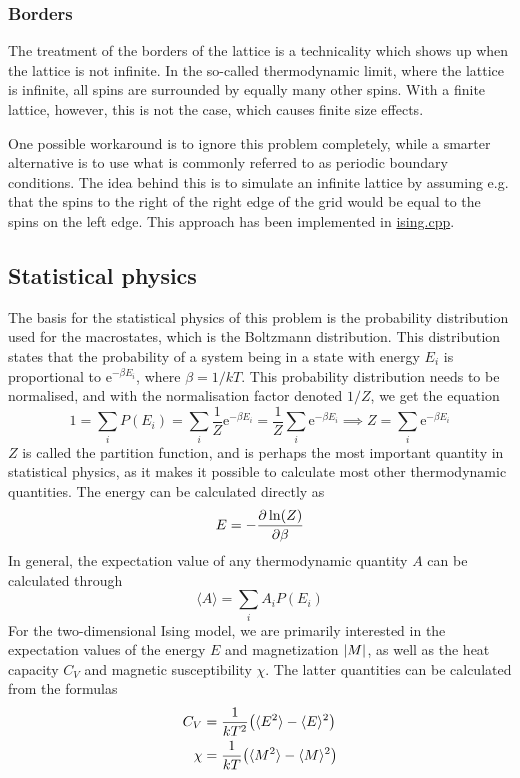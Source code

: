 \documentclass[12pt,english,a4paper]{article}
\renewcommand{\exp}[1]{\mathrm{e}^{#1}}
\newcommand{\program}[1]{\href{https://github.com/anjohan/Offentlig/blob/master/FYS3150/Oblig4/#1}{#1}}
\begin{document}
\subsubsection{Borders}
The treatment of the borders of the lattice is a technicality which shows up when the lattice is not infinite. In the so-called thermodynamic limit, where the lattice is infinite, all spins are surrounded by equally many other spins. With a finite lattice, however, this is not the case, which causes finite size effects.

One possible workaround is to ignore this problem completely, while a smarter alternative is to use what is commonly referred to as periodic boundary conditions. The idea behind this is to simulate an infinite lattice by assuming e.g. that the spins to the right of the right edge of the grid would be equal to the spins on the left edge. This approach has been implemented in \program{ising.cpp}.

\subsection{Statistical physics}
The basis for the statistical physics of this problem is the probability distribution used for the macrostates, which is the Boltzmann distribution. This distribution states that the probability of a system being in a state with energy \(E_i\) is proportional to \(\exp{-\beta E_i}\), where \(\beta=1/kT\). This probability distribution needs to be normalised, and with the normalisation factor denoted \(1/Z\), we get the equation
\[
1 = \sum_i P(E_i) = \sum_i \frac{1}{Z}\exp{-\beta E_i} = \frac{1}{Z}\sum_i\exp{-\beta E_i} \implies Z = \sum_i \exp{-\beta E_i}
\]
\(Z\) is called the partition function, and is perhaps the most important quantity in statistical physics, as it makes it possible to calculate most other thermodynamic quantities. The energy can be calculated directly as
\[
E = -\pdv{\ln(Z)}{\beta}
\]
In general, the expectation value of any thermodynamic quantity \(A\) can be calculated through
\[
\langle A\rangle = \sum_i A_iP(E_i)
\]
For the two-dimensional Ising model, we are primarily interested in the expectation values of the energy \(E\) and magnetization \(\abs{M}\), as well as the heat capacity \(C_V\) and magnetic susceptibility \(\chi\). The latter quantities can be calculated from the formulas\autocite{compphys}
\begin{alignat*}{2}
C_V &= \frac{1}{kT^2}\qty(\langle E^2\rangle - \langle E\rangle^2)\\
\chi &= \frac{1}{kT}\qty(\langle M^2\rangle - \langle M\rangle^2)
\end{alignat*}
\end{document}
